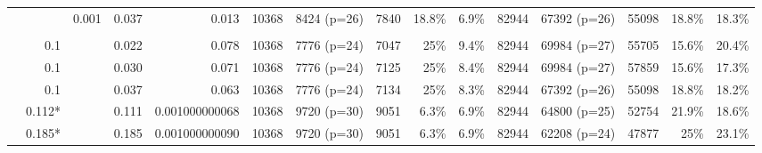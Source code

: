 \begin{table*}[ht]
\begin{tabular}{|l|rrrrrrrrrrrrrr|}
		& \color{red}{0.05} & 0.001 & 0.037 & 0.013 & 10368 & 8424 (p=26) & 7840 & 18.8\% & 6.9\% & 82944 & 67392 (p=26) & 55098 & 18.8\% & 18.3\% \\
		
		& & & & & & & & & & & & & &\\
		
		& 0.1 & \color{red}{0.0006} & 0.022 & 0.078 & 10368 & 7776 (p=24) & 7047 & 25\% & 9.4\% & 82944 & 69984 (p=27) & 55705 & 15.6\% & 20.4\% \\
		
		& 0.1 & \color{red}{0.0008} & 0.030 & 0.071 & 10368 & 7776 (p=24) & 7125 & 25\% & 8.4\% & 82944 & 69984 (p=27) & 57859 & 15.6\% & 17.3\% \\
		
		& 0.1 & \color{red}{0.0010} & 0.037 & 0.063 & 10368 & 7776 (p=24) & 7134 & 25\% & 8.3\% & 82944 & 67392 (p=26) & 55098 & 18.8\% & 18.2\% \\
		
		& 0.112* & \color{red}{0.0030} & 0.111 & 0.001000000068 & 10368 &  9720 (p=30) & 9051 & 6.3\% & 6.9\% & 82944 & 64800 (p=25) & 52754 & 21.9\% & 18.6\% \\
		
		& 0.185* &\color{red}{0.0050} & 0.185 & 0.001000000090 & 10368 & 9720 (p=30) & 9051 & 6.3\% & 6.9\% & 82944 & 62208 (p=24) & 47877 & 25\%& 23.1\% \\
		\cline{1-15}
	\end{tabular}
\end{table*}

